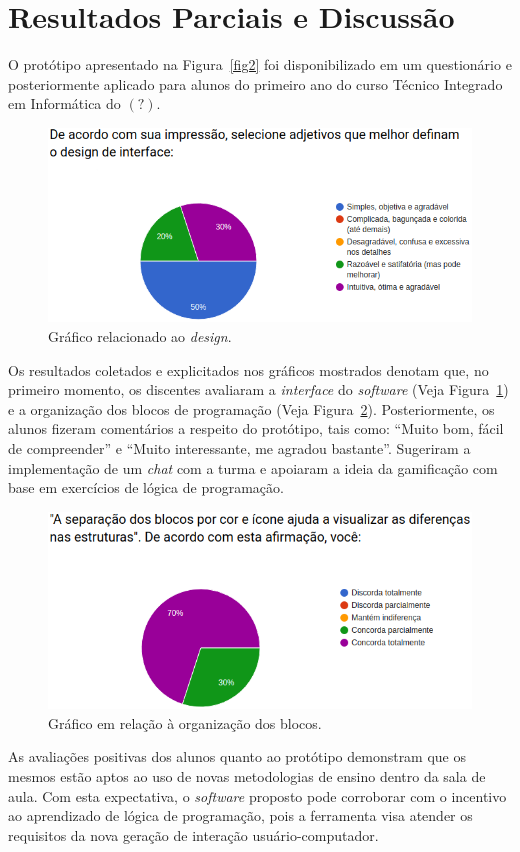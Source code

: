 \documentclass[12pt]{article}
\begin{document}
\section{Resultados Parciais e Discussão}
O protótipo apresentado na Figura~\ref{fig2} foi disponibilizado em um questionário e posteriormente aplicado para alunos do primeiro ano do curso Técnico Integrado em Informática do $(?)$.
	\begin{figure}[!htbp]
		\centering
		\includegraphics[scale=0.4]{g1.png}
		\caption{Gráfico relacionado ao \textit{design}.}
		\label{fig3}
	\end{figure}
\par Os resultados coletados e explicitados nos gráficos mostrados denotam que, no primeiro momento, os discentes avaliaram a \textit{interface} do \textit{software} (Veja Figura~\ref{fig3}) e a organização dos blocos de programação (Veja Figura~\ref{fig4}). Posteriormente, os alunos fizeram comentários a respeito do protótipo, tais como: ``Muito bom, fácil de compreender'' e ``Muito interessante, me agradou bastante''. Sugeriram a implementação de um \textit{chat} com a turma e apoiaram a ideia da gamificação com base em exercícios de lógica de programação.
	\begin{figure}[!htbp]
		\centering
		\includegraphics[scale=0.4]{g2.png}
		\caption{Gráfico em relação à organização dos blocos.}
		\label{fig4}
	\end{figure} 
\par As avaliações positivas dos alunos quanto ao protótipo demonstram que os mesmos estão aptos ao uso de novas metodologias de ensino dentro da sala de aula. Com esta expectativa, o \textit{software} proposto pode corroborar com o incentivo ao aprendizado de lógica de programação, pois a ferramenta visa atender os requisitos da nova geração de interação usuário-computador. 	
\end{document}
